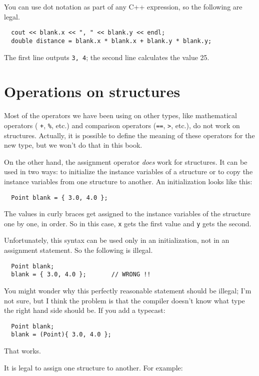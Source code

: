 You can use dot notation as part of any C++ expression, so the
following are legal.

\begin{verbatim}
  cout << blank.x << ", " << blank.y << endl;
  double distance = blank.x * blank.x + blank.y * blank.y;
\end{verbatim}
%
The first line outputs {\tt 3, 4}; the second line calculates
the value 25.

\section{Operations on structures}

Most of the operators we have been using on other types, like
mathematical operators ( {\tt +}, {\tt \%}, etc.) and comparison
operators ({\tt ==}, {\tt >}, etc.), do not work on structures.
Actually, it is possible to define the meaning of these operators
for the new type, but we won't do that in this book.

On the other hand, the assignment operator {\em does} work for
structures.  It can be used in two ways: to initialize the instance
variables of a structure or to copy the instance variables from one
structure to another.  An initialization looks like this:

\begin{verbatim}
  Point blank = { 3.0, 4.0 };
\end{verbatim}
%
The values in curly braces get assigned to the instance variables of
the structure one by one, in order.  So in this case, {\tt x}
gets the first value and {\tt y} gets the second.

Unfortunately, this syntax can be used only in an initialization,
not in an assignment statement.  So the following is illegal.

\begin{verbatim}
  Point blank;
  blank = { 3.0, 4.0 };       // WRONG !!
\end{verbatim}
%
You might wonder why this perfectly reasonable statement should
be illegal; I'm not sure, but I think the problem is that the compiler
doesn't know what type the right hand side should be.  If you
add a typecast:

\begin{verbatim}
  Point blank;
  blank = (Point){ 3.0, 4.0 };
\end{verbatim}
%
That works.

It is legal to assign one structure to
another.  For example:

